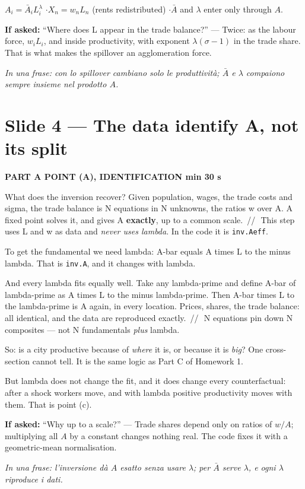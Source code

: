 \documentclass[11pt,a4paper]{article}
\newcommand{\slide}[3]{\Needspace{14\baselineskip}\section{#1}\textcolor{unicared}{\small\bfseries\MakeUppercase{#3}\quad\textperiodcentered\quad #2}\par}
\newcommand{\idea}[1]{\par{\small\itshape\color{unicablue}In una frase: #1}\par}
\newcommand{\pause}{\textcolor{unicared}{\,/\!/\,}}
\begin{document}
\begin{nums}
$A_i = \bar A_i L_i^\lambda$ \quad$\cdot$\quad $X_n = w_n L_n$ (rents redistributed) \quad$\cdot$\quad $\bar A$ and $\lambda$ enter only through $A$.
\end{nums}
\begin{ask}
\textbf{If asked:} ``Where does L appear in the trade balance?'' --- Twice: as the labour force, $w_iL_i$, and inside productivity, with exponent $\lambda(\sigma-1)$ in the trade share. That is what makes the spillover an agglomeration force.
\end{ask}
\idea{con lo spillover cambiano solo le produttività; $\bar A$ e $\lambda$ compaiono sempre insieme nel prodotto $A$.}

\slide{Slide 4 --- The data identify A, not its split}{1 min 30 s}{Part A \textperiodcentered{} point (a), identification}

\begin{say}
What does the inversion recover? Given population, wages, the trade costs and sigma, the trade balance is N equations in N unknowns, the ratios w over A. A fixed point solves it, and gives A \textbf{exactly}, up to a common scale. \pause\ This step uses L and w as data and \emph{never uses lambda}. In the code it is \texttt{inv.Aeff}.

To get the fundamental we need lambda: A-bar equals A times L to the minus lambda. That is \texttt{inv.A}, and it changes with lambda.

And every lambda fits equally well. Take any lambda-prime and define A-bar of lambda-prime as A times L to the minus lambda-prime. Then A-bar times L to the lambda-prime is A again, in every location. Prices, shares, the trade balance: all identical, and the data are reproduced exactly. \pause\ N equations pin down N composites --- not N fundamentals \emph{plus} lambda.

So: is a city productive because of \emph{where} it is, or because it is \emph{big}? One cross-section cannot tell. It is the same logic as Part C of Homework 1.

But lambda does not change the fit, and it does change every counterfactual: after a shock workers move, and with lambda positive productivity moves with them. That is point (c).
\end{say}

\begin{ask}
\textbf{If asked:} ``Why up to a scale?'' --- Trade shares depend only on ratios of $w/A$; multiplying all $A$ by a constant changes nothing real. The code fixes it with a geometric-mean normalisation.
\end{ask}
\idea{l'inversione dà $A$ esatto senza usare $\lambda$; per $\bar A$ serve $\lambda$, e ogni $\lambda$ riproduce i dati.}
\end{document}
